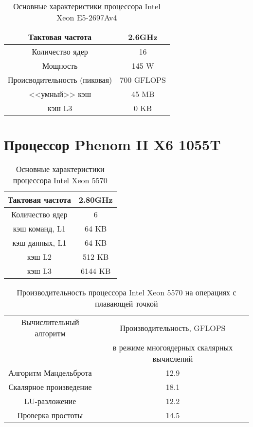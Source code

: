 \begin{table}[ht]
	\begin{center}
		\caption{Основные характеристики процессора Intel Xeon  E5-2697Av4}
		\begin{tabular}{|c|c|}
			\hline	
			Тактовая частота & 2.6GHz   \\ \hline
			Количество ядер & 16 	     \\ \hline
			Мощность        &  145 W      \\ \hline
			Происводительность (пиковая) &  700 GFLOPS       \\ \hline
			<<умный>> кэш   &  45 MB      \\ \hline
			кэш L3          &  0 KB        \\ \hline
		\end{tabular}
	\end{center} 	
\end{table} 	





\section{Процессор Phenom II X6 1055T}
\begin{table}[ht]
	\begin{center}
		\caption{Основные характеристики процессора Intel Xeon  5570}
		\begin{tabular}{|c|c|}
			\hline	
			Тактовая частота & 2.80GHz   \\ \hline
			Количество ядер & 6 	     \\ \hline
			кэш команд, L1 &  64 KB      \\ \hline
			кэш данных, L1 &  64 KB       \\ \hline
			кэш L2         &  512 KB      \\ \hline
			кэш L3         &  6144 KB        \\ \hline
		\end{tabular}
	\end{center} 	
\end{table} 	

\begin{table}[ht]
	\begin{center}
		\caption{Производительность процессора Intel Xeon  5570 на операциях с плавающей точкой}
		\begin{tabular}{|c|c|}
			\hline	
			Вычислительный алгоритм &  Производительность, GFLOPS \\ 
			& в режиме многоядерных скалярных вычислений \\ \hline
			Алгоритм Мандельброта  &  12.9 	\\ \hline
			Скалярное произведение &  18.1   \\ \hline
			LU-разложение          &  12.2  \\ \hline
			Проверка простоты      &  14.5  \\ \hline 
			
			
		\end{tabular}
	\end{center} 	
\end{table} 	

